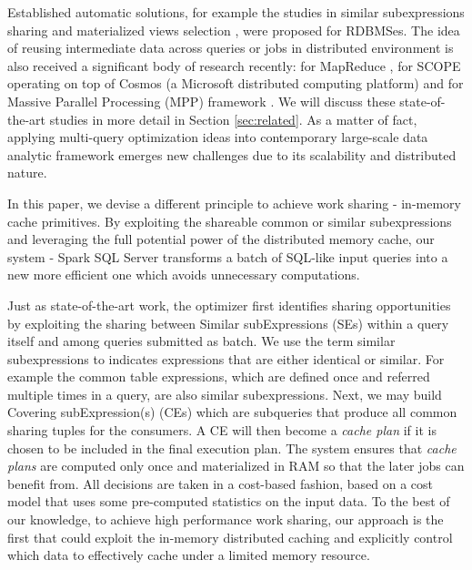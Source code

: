 Established automatic solutions, for example the studies in similar subexpressions sharing \cite{zhou2007efficient} and materialized views selection \cite{goldstein2001optimizing, mistry2001materialized}, were proposed for RDBMSes. 
The idea of reusing intermediate data across queries or jobs in distributed environment is also received a significant body of research  recently: for MapReduce \cite{mrshare, mqo}, for SCOPE operating on top of Cosmos (a Microsoft distributed computing platform) \cite{silva2012exploiting} and for Massive Parallel Processing (MPP) framework \cite{el2015optimization}. We will discuss these state-of-the-art studies in more detail in Section \ref{sec:related}. As a matter of fact, applying multi-query optimization ideas into contemporary large-scale data analytic framework emerges new challenges due to its scalability and distributed nature.

In this paper, we devise a different principle to achieve work sharing - in-memory cache primitives. By exploiting the shareable common or similar subexpressions and leveraging the full potential power of the distributed memory cache, our system - Spark SQL Server transforms a batch of SQL-like input queries into a new more efficient one which avoids unnecessary computations.

Just as state-of-the-art work, the optimizer first identifies sharing opportunities by exploiting the sharing between Similar subExpressions (SEs) within a query itself and among queries submitted as batch. We use the term similar subexpressions to indicates expressions that are either identical or similar. For example the common table expressions, which are defined once and referred multiple times in a query, are also similar subexpressions. Next, we may build Covering subExpression(s) (CEs) which are subqueries that produce all common sharing tuples for the consumers. A CE will then become a \emph{cache plan} if it is chosen to be included in the final execution plan. The system ensures that \emph{cache plans} are computed only once and materialized in RAM so that the later jobs can benefit from. All decisions are taken in a cost-based fashion, based on a cost model that uses some pre-computed statistics on the input data. To the best of our knowledge, to achieve high performance work sharing, our approach is the first that could exploit the in-memory distributed caching and explicitly control which data to effectively cache  under a limited memory resource.

